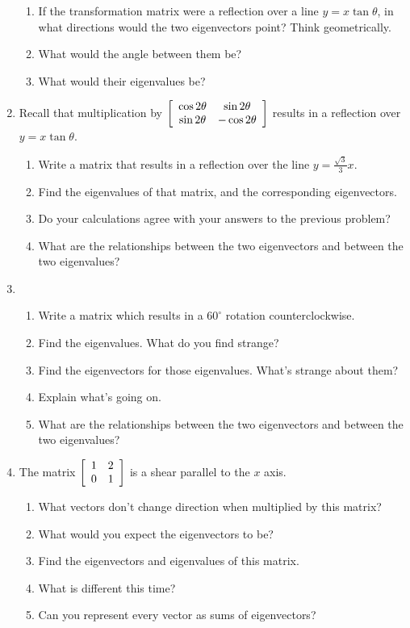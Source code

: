 \documentclass[../gatm.tex]{subfiles}
\begin{document}
\begin{enumerate}
\begin{enumerate}
\item If the transformation matrix were a reflection over a line $y=x\tan\theta$, in what directions would the two eigenvectors point? Think geometrically.
\item What would the angle between them be?
\item What would their eigenvalues be?
\end{enumerate}
\item Recall that multiplication by $\left[\begin{array}{cc} \cos 2\theta & \sin 2\theta \\ \sin 2\theta & -\cos 2\theta \end{array}\right]$ results in a reflection over $y=x\tan \theta$.
\begin{enumerate}
\item Write a matrix that results in a reflection over the line $y=\frac{\sqrt{3}}{3}x.$
\item Find the eigenvalues of that matrix, and the corresponding eigenvectors.
\item Do your calculations agree with your answers to the previous problem?
\item What are the relationships between the two eigenvectors and between the two eigenvalues?
\end{enumerate}
\item \begin{enumerate}
\item Write a matrix which results in a $60^\circ$ rotation counterclockwise.
\item Find the eigenvalues. What do you find strange?
\item Find the eigenvectors for those eigenvalues. What's strange about them?
\item Explain what's going on.
\item What are the relationships between the two eigenvectors and between the two eigenvalues?
\end{enumerate}
\item The matrix $\left[\begin{array}{cc} 1 & 2 \\ 0 & 1 \end{array}\right]$ is a shear parallel to the $x$ axis.
\begin{enumerate}
\item What vectors don't change direction when multiplied by this matrix?
\item What would you expect the eigenvectors to be?
\item Find the eigenvectors and eigenvalues of this matrix.
\item What is different this time?
\item Can you represent every vector as sums of eigenvectors?
\end{enumerate}

\end{enumerate}
\end{document}
